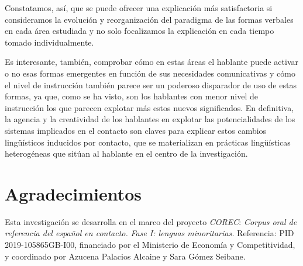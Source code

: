 \documentclass[output=paper]{../langscibook}
\begin{document}
Constatamos, así, que se puede ofrecer una explicación más satisfactoria si consideramos la evolución y reorganización del paradigma de las formas verbales en cada área estudiada y no solo focalizamos la explicación en cada tiempo tomado individualmente. 

Es interesante, también, comprobar cómo en estas áreas el hablante puede activar o no esas formas emergentes en función de sus necesidades comunicativas y cómo el nivel de instrucción también parece ser un poderoso disparador de uso de estas formas, ya que, como se ha visto, son los hablantes con menor nivel de instrucción los que parecen explotar más estos nuevos significados. En definitiva, la agencia y la creatividad de los hablantes en explotar las potencialidades de los sistemas implicados en el contacto son claves para explicar estos cambios lingüísticos inducidos por contacto, que se materializan en prácticas lingüísticas heterogéneas que sitúan al hablante en el centro de la investigación.  

\section*{Agradecimientos}
Esta investigación se desarrolla en el marco del proyecto \textit{COREC}: \textit{Corpus oral de referencia del español en contacto.} \textit{Fase I: lenguas minoritarias.} Referencia: PID 2019-105865GB-I00, financiado por el Ministerio de Economía y Competitividad, y coordinado por Azucena Palacios Alcaine y Sara Gómez Seibane.


\sloppy\printbibliography[heading=subbibliography,notkeyword=this]
\end{document}
